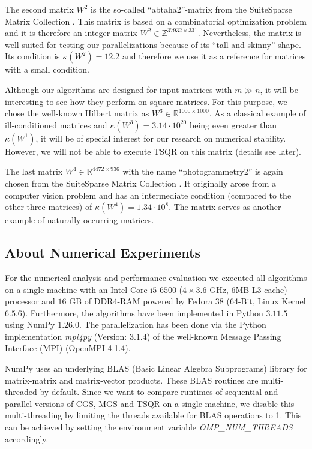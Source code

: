 \documentclass{article}
\begin{document}
The second matrix $W^2$ is the so-called \enquote{abtaha2}-matrix from the
SuiteSparse Matrix Collection \cite{DavisHu:2011}. This matrix is based on a
combinatorial optimization problem and it is therefore an integer matrix $W^2
\in \mathbb{Z}^{37932 \times 331}$. Nevertheless, the matrix is well suited for
testing our parallelizations because of its \enquote{tall and skinny} shape. Its
condition is $\kappa(W^2) = 12.2$ and therefore we use it as a reference for
matrices with a small condition.

Although our algorithms are designed for input matrices with $m \gg n$, it will
be interesting to see how they perform on square matrices. For this purpose, we
chose the well-known Hilbert matrix as $W^3 \in \mathbb{R}^{1000 \times 1000}$.
As a classical example of ill-conditioned matrices and $\kappa(W^3) = 3.14
\cdot10^{20}$ being even greater than $\kappa(W^1)$, it will be of special
interest for our research on numerical stability. However, we will not be able
to execute TSQR on this matrix (details see later).

The last matrix $W^4 \in \mathbb{R}^{4472 \times 936}$ with the name
\enquote{photogrammetry2} is again chosen from the SuiteSparse Matrix Collection
\cite{DavisHu:2011}. It originally arose from a computer vision problem and has
an intermediate condition (compared to the other three matrices) of $\kappa(W^4)
= 1.34 \cdot10^{8}$. The matrix serves as another example of naturally occurring
matrices.

\subsection{About Numerical Experiments}

For the numerical analysis and performance evaluation we executed all algorithms
on a single machine with an Intel Core i$5$ $6500$ ($4 \times 3.6$ GHz, $6$MB L3
cache) processor and $16$ GB of DDR4-RAM powered by Fedora 38 (64-Bit, Linux
Kernel $6.5.6$). Furthermore, the algorithms have been implemented in Python
$3.11.5$ using NumPy $1.26.0$. The parallelization has been done via the Python
implementation \textit{mpi4py} (Version: $3.1.4$) of the well-known Message
Passing Interface (MPI) (OpenMPI 4.1.4).

NumPy uses an underlying BLAS (Basic Linear Algebra Subprograms) library for
matrix-matrix and matrix-vector products. These BLAS routines are multi-threaded
by default. Since we want to compare runtimes of sequential and parallel
versions of CGS, MGS and TSQR on a single machine, we disable this
multi-threading by limiting the threads available for BLAS operations to 1. This
can be achieved by setting the environment variable \textit{OMP\_NUM\_THREADS}
accordingly.
\end{document}

